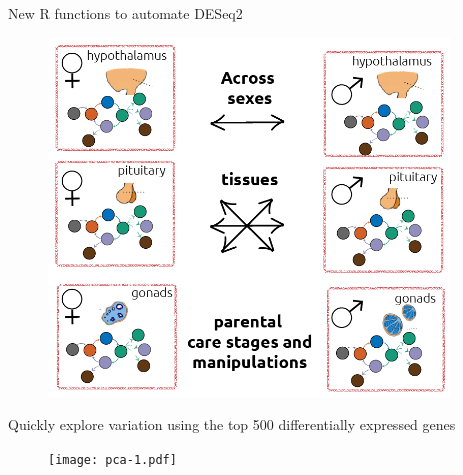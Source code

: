 \documentclass[final]{beamer}
\newlength{\onecolwid}
\newlength{\twocolwid}
\begin{document}
\begin{frame}[t]
\begin{columns}[t]
\begin{column}{\twocolwid}
\begin{columns}[t,totalwidth=\twocolwid]
\begin{column}{\onecolwid}
\begin{block}{{\normalsize New R functions to automate DESeq2}}
\begin{figure}
\includegraphics[width=0.75\linewidth]{DoveParentsRNAseq_approach-2.png}
\end{figure}



\end{block}

\begin{block}{{\normalsize Quickly explore variation using the top 500 differentially expressed genes}}

\begin{figure}
\texttt{[image: pca-1.pdf]}
\end{figure}


\vspace{0.25em}

\end{block}


 \vspace{-3em}




\end{column} %


\begin{column}{\onecolwid} %


\vspace{-0.5em}


\end{column}
\end{columns}
\end{column}
\end{columns}
\end{frame}
\end{document}
